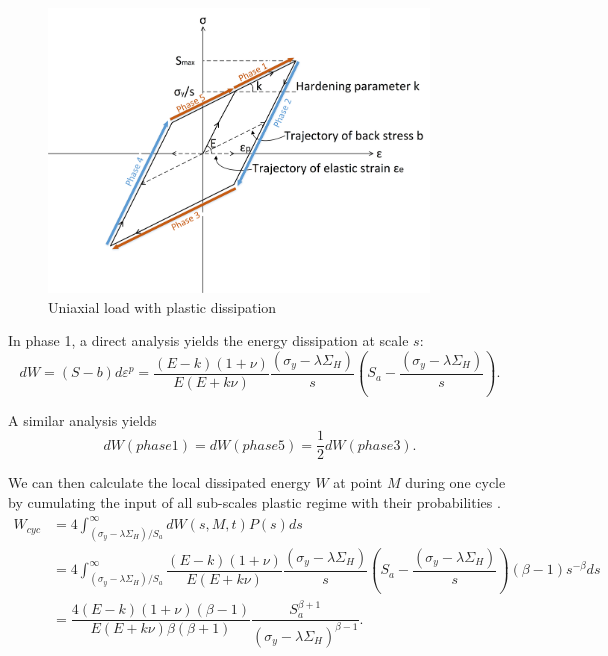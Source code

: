 \documentclass[3p,times,number,review]{elsarticle}
\begin{document}
\begin{figure}[!h]
\centering
\includegraphics[width=0.9\textwidth]{figures//backstress.png} 
\caption{Uniaxial load with plastic dissipation}
\label{backstress}
\end{figure}

In phase 1, a direct analysis yields the energy dissipation at scale $s$:
\begin{equation}dW=(S-b)d\varepsilon^p=\dfrac{(E-k)(1+\nu) }{E(E+k\nu)}\dfrac{ \left(\sigma_y-\lambda \Sigma_H\right)}{s}\left(S_{a}-\dfrac{ \left(\sigma_y-\lambda \Sigma_H\right)}{s}\right).
\label{dw}
\end{equation}

A similar analysis yields $$dW(phase 1)=dW(phase 5)=\dfrac{1}{2}dW(phase 3).$$

We can then calculate  the local dissipated energy $W$  at point $M$ during one cycle by cumulating the input of all sub-scales plastic regime with their probabilities \cite{zepeng}.
\begin{equation}
\begin{split}
W_{cyc}&=4\int_{ \left(\sigma_y-\lambda \Sigma_H\right) /S_{a}}^{\infty}dW(s,M,t)P(s)ds
\\&=4\int_{ \left(\sigma_y-\lambda \Sigma_H\right) /S_{a}}^{\infty}\dfrac{(E-k)(1+\nu) }{E(E+k\nu)}\dfrac{ \left(\sigma_y-\lambda \Sigma_H\right)}{s}\left(S_{a}-\dfrac{ \left(\sigma_y-\lambda \Sigma_H\right)}{s}\right)\left( \beta-1\right) s^{-\beta}ds
\\&=\dfrac{4(E-k)(1+\nu)\left( \beta-1\right) }{ E(E+k\nu)\beta\left( \beta+1\right) }\dfrac{S_{a}^{\beta+1}}{ \left(\sigma_y-\lambda \Sigma_H\right)^{\beta-1}}.
\end{split}
\label{eq:w}
\end{equation}
\end{document}

